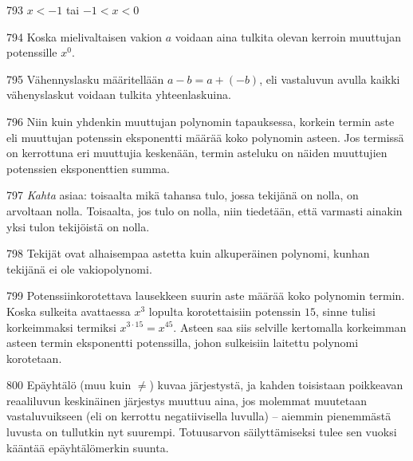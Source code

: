 \begin{Vastaus}{793}
        $x<-1$ tai $ -1<x<0$
    
\end{Vastaus}
\begin{Vastaus}{794}
	Koska mielivaltaisen vakion $a$ voidaan aina tulkita olevan kerroin muuttujan potenssille $x^0$.
	
\end{Vastaus}
\begin{Vastaus}{795}
	Vähennyslasku määritellään $a-b=a+(-b)$, eli vastaluvun avulla kaikki vähenyslaskut voidaan tulkita yhteenlaskuina.
	
\end{Vastaus}
\begin{Vastaus}{796}
	Niin kuin yhdenkin muuttujan polynomin tapauksessa, korkein termin aste eli muuttujan potenssin eksponentti määrää koko polynomin asteen. Jos termissä on kerrottuna eri muuttujia keskenään, termin asteluku on näiden muuttujien potenssien eksponenttien summa.
	
\end{Vastaus}
\begin{Vastaus}{797}
\textit{Kahta} asiaa: toisaalta mikä tahansa tulo, jossa tekijänä on nolla, on arvoltaan nolla. Toisaalta, jos tulo on nolla, niin tiedetään, että varmasti ainakin yksi tulon tekijöistä on nolla.
	
\end{Vastaus}
\begin{Vastaus}{798}
Tekijät ovat alhaisempaa astetta kuin alkuperäinen polynomi, kunhan tekijänä ei ole vakiopolynomi.
	
\end{Vastaus}
\begin{Vastaus}{799}
Potenssiinkorotettava lausekkeen suurin aste määrää koko polynomin termin. Koska sulkeita avattaessa $x^3$ lopulta korotettaisiin potenssin $15$, sinne tulisi korkeimmaksi termiksi $x^{3\cdot 15}=x^{45}$. Asteen saa siis selville kertomalla korkeimman asteen termin eksponentti potenssilla, johon sulkeisiin laitettu polynomi korotetaan.
	
\end{Vastaus}
\begin{Vastaus}{800}
Epäyhtälö (muu kuin $\neq$) kuvaa järjestystä, ja kahden toisistaan poikkeavan reaaliluvun keskinäinen järjestys muuttuu aina, jos molemmat muutetaan vastaluvuikseen (eli on kerrottu negatiivisella luvulla) -- aiemmin pienemmästä luvusta on tullutkin nyt suurempi. Totuusarvon säilyttämiseksi tulee sen vuoksi kääntää epäyhtälömerkin suunta.
	
\end{Vastaus}
